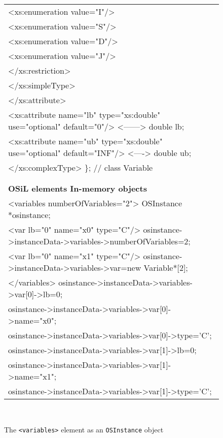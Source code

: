 \begin{figure}[hb]
{{\begin{tabular}{@{}l@{}}
        <xs:enumeration value="I"/>\\[\Sb]
        <xs:enumeration value="S"/>\\[\Sb]
        <xs:enumeration value="D"/>\\[\Sb]
        <xs:enumeration value="J"/>\\[\Sb]
      </xs:restriction>\\[\Sb]
    </xs:simpleType>\\[\Sb]
  </xs:attribute>\\[\Sb]
  <xs:attribute name="lb" type="xs:double" use="optional" default="0"/>  <------>    double lb;\\[\Sb]
  <xs:attribute name="ub" type="xs:double" use="optional" default="INF"/>  <---->    double ub;\\[\Sb]
</xs:complexType>                                                                  \}; // class Variable\\[\Sb]
 \\[\Sb]
 \\[\Sb]
\textsf{\textbf{OSiL elements          \hspace{1.83in}  In-memory objects}}\\[\Sa]
<variables numberOfVariables="2">                   OSInstance *osinstance;\\[\Sb]
   <var lb="0" name="x0" type="C"/>                 osinstance->instanceData->variables->numberOfVariables=2;\\[\Sb]
   <var lb="0" name="x1" type="C"/>                 osinstance->instanceData->variables->var=new Variable*[2];\\[\Sb]
</variables>                                        osinstance->instanceData->variables->var[0]->lb=0;\\[\Sb]
                                                    osinstance->instanceData->variables->var[0]->name="x0";\\[\Sb]
                                                    osinstance->instanceData->variables->var[0]->type={\rm 'C'};\\[\Sb]
                                                    osinstance->instanceData->variables->var[1]->lb=0;\\[\Sb]
                                                    osinstance->instanceData->variables->var[1]->name="x1";\\[\Sb]
                                                    osinstance->instanceData->variables->var[1]->type={\rm 'C'};
\end{tabular} }} \medskip\\[\Sb]
\caption{The {\tt <variables>} element as an {\tt OSInstance} object} \label{figure:osinstancevariables}
\end{figure}


